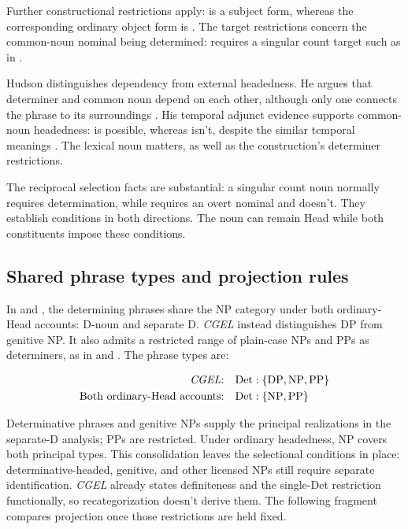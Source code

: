 \documentclass[12pt]{article}
\begin{document}
Further constructional restrictions apply:  is a subject form, whereas the corresponding ordinary object form is . The target restrictions concern the common-noun nominal being determined:  requires a singular count target such as  in .

Hudson distinguishes dependency from external headedness. He argues that determiner and common noun depend on each other, although only one connects the phrase to its surroundings \citep[7--8]{hudson2004determiners}. His temporal adjunct evidence supports common-noun headedness:  is possible, whereas  isn't, despite the similar temporal meanings \citep[10--12]{hudson2004determiners}. The lexical noun matters, as well as the construction's determiner restrictions.

The reciprocal selection facts are substantial: a singular count noun normally requires determination, while  requires an overt nominal and  doesn't. They establish conditions in both directions. The noun can remain Head while both constituents impose these conditions.

\subsection{Shared phrase types and projection rules}\label{sec:det-uniform}

In  and , the determining phrases share the NP category under both ordinary-Head accounts: D-noun and separate D. \textit{CGEL} instead distinguishes DP from genitive NP. It also admits a restricted range of plain-case NPs and PPs as determiners, as in  and  \citep[Ch.~5, §4]{huddleston2002}. The phrase types are:

\[
\begin{aligned}
\text{\textit{CGEL}:} &\quad \mathrm{Det}:\{\mathrm{DP},\mathrm{NP},\mathrm{PP}\} \\
\text{Both ordinary-Head accounts:} &\quad \mathrm{Det}:\{\mathrm{NP},\mathrm{PP}\}
\end{aligned}
\]

Determinative phrases and genitive NPs supply the principal realizations in the separate-D analysis; PPs are restricted. Under ordinary headedness, NP covers both principal types. This consolidation leaves the selectional conditions in place: determinative-headed, genitive, and other licensed NPs still require separate identification. \textit{CGEL} already states definiteness and the single-Det restriction functionally, so recategorization doesn't derive them. The following fragment compares projection once those restrictions are held fixed.
\end{document}

